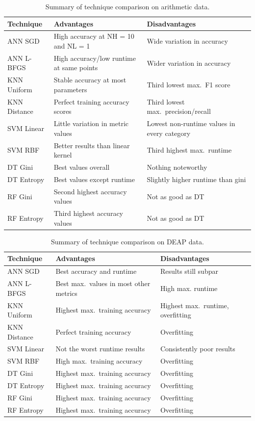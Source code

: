\documentclass[12pt]{uthesis-v12}  %
\begin{document}
\begin{table}[!t]
\caption{Summary of technique comparison on arithmetic data.}
\renewcommand{\arraystretch}{1.3}
\centering
\resizebox{\textwidth}{!}
{\begin{tabular}{*{3}{l}}
\toprule
Technique & Advantages & Disadvantages \\ \midrule
ANN SGD & High accuracy at NH = 10 and NL = 1 & Wide variation in accuracy \\
ANN L-BFGS & High accuracy/low runtime at same points & Wider variation in accuracy \\
KNN Uniform & Stable accuracy at most parameters & Third lowest max.~F1 score \\
KNN Distance & Perfect training accuracy scores & Third lowest max.~precision/recall \\
SVM Linear & Little variation in metric values & Lowest non-runtime values in every category \\
SVM RBF & Better results than linear kernel & Third highest max.~runtime \\
DT Gini & Best values overall & Nothing noteworthy \\
DT Entropy & Best values except runtime & Slightly higher runtime than gini \\
RF Gini & Second highest accuracy values & Not as good as DT\\
RF Entropy & Third highest accuracy values & Not as good as DT \\ \bottomrule
\end{tabular}}

\label{compare-nata}
\end{table}

\begin{table}[!t]
\caption{Summary of technique comparison on DEAP data.}
\renewcommand{\arraystretch}{1.3}
\centering
\resizebox{\textwidth}{!}
{\begin{tabular}{*{3}{l}}
\toprule
Technique & Advantages & Disadvantages \\ \midrule
ANN SGD & Best accuracy and runtime & Results still subpar \\
ANN L-BFGS & Best max.~values in most other metrics & High max. runtime \\
KNN Uniform & Highest max.~training accuracy & Highest max.~runtime, overfitting \\
KNN Distance & Perfect training accuracy & Overfitting \\
SVM Linear & Not the worst runtime results & Consistently poor results \\
SVM RBF & High max.~training accuracy & Overfitting \\
DT Gini & Highest max.~training accuracy & Overfitting \\
DT Entropy & Highest max.~training accuracy & Overfitting \\
RF Gini & Highest max.~training accuracy & Overfitting \\
RF Entropy & Highest max.~training accuracy & Overfitting \\ \bottomrule
\end{tabular}}

\label{compare-deap}
\end{table}
\end{document}
